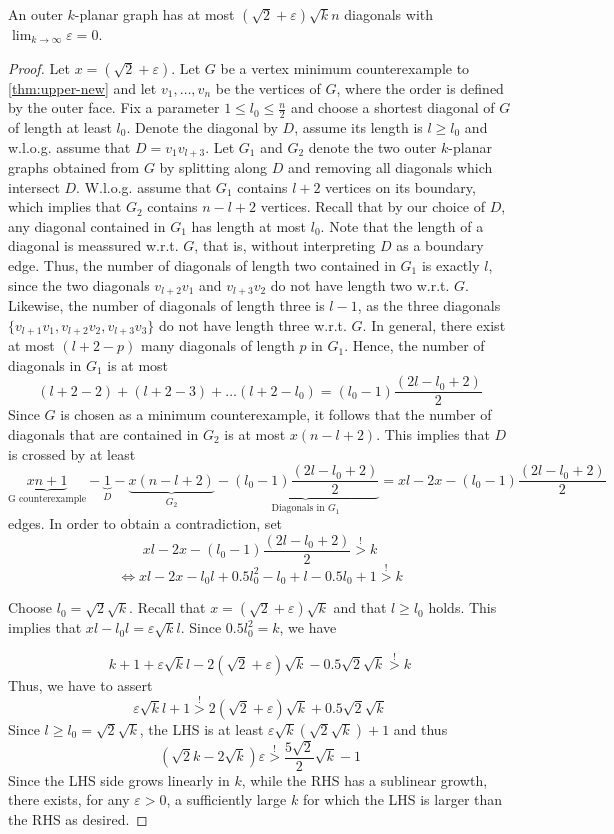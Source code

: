 \documentclass[10pt,a4paper]{amsart}
\begin{document}
\begin{theorem} \label{thm:upper-new}
An outer $k$-planar graph has at most $(\sqrt{2}+\varepsilon)\sqrt{k}n$ diagonals with 
$\lim_{k\to \infty} \varepsilon= 0$.
\end{theorem}

\begin{proof}
Let $x = (\sqrt{2}+\varepsilon)$.
Let $G$ be a vertex minimum counterexample to \cref{thm:upper-new} and let $v_1,\dots,v_n$ be the vertices of $G$, where the order is defined by the outer face. Fix a parameter $1 \leq l_0 \leq \frac{n}{2}$ and choose a shortest diagonal of $G$ of length at least $l_0$. Denote the diagonal by $D$, assume its length is $l \geq l_0$ and w.l.o.g. assume that $D = v_1v_{l+3}$. Let $G_1$ and $G_2$ denote the two outer $k$-planar graphs obtained from $G$ by splitting along $D$ and removing all diagonals which intersect $D$. W.l.o.g. assume that $G_1$ contains $l+2$ vertices on its boundary, which implies that $G_2$ contains $n-l+2$ vertices.
Recall that by our choice of $D$, any diagonal contained in $G_1$ has length at most $l_0$.
Note that the length of a diagonal is meassured w.r.t. $G$, that is, without interpreting $D$ as a boundary edge. Thus, the number of diagonals of length two contained in $G_1$ is exactly $l$, since the two diagonals $v_{l+2}v_1$ and $v_{l+3}v_2$ do not have length two w.r.t. $G$. 
Likewise, the number of diagonals of length three is $l-1$, as the three diagonals $\{v_{l+1}v_1,v_{l+2}v_2,v_{l+3}v_3\}$ do not have length three w.r.t. $G$. In general, there exist at most $(l+2-p)$ many diagonals of length $p$ in $G_1$.
Hence, the number of diagonals in $G_1$ is at most
\[(l+2-2)+(l+2-3)+\dots(l+2-l_0) = (l_0-1)\frac{(2l-l_0+2)}{2}\]
Since $G$ is chosen as a minimum counterexample, it follows that the number of diagonals that are contained in $G_2$ is at most $x(n-l+2)$.
This implies that $D$ is crossed by at least
\[\underbrace{xn+1}_{\text{G counterexample}} -\underbrace{1}_D - \underbrace{x(n-l+2)}_{G_2} - \underbrace{(l_0-1)\frac{(2l-l_0+2)}{2}}_{\text{Diagonals in }G_1} = xl-2x - (l_0-1)\frac{(2l-l_0+2)}{2} \] edges.
In order to obtain a contradiction, set
\[xl-2x - (l_0-1)\frac{(2l-l_0+2)}{2} \stackrel{!}{>} k\]
\[\Leftrightarrow xl-2x-l_0l+0.5l_0^2-l_0+l-0.5l_0+1 \stackrel{!}{>}k\]

Choose $l_0 = \sqrt{2}\sqrt{k}$. Recall that $x = (\sqrt{2}+\varepsilon)\sqrt{k}$ and that $l \geq l_0$ holds. 
This implies that $xl-l_0l = \varepsilon\sqrt{k}l$. Since $0.5l_0^2 = k$, we have

\[k + 1 + \varepsilon\sqrt{k}l -2(\sqrt{2}+\varepsilon)\sqrt{k} -0.5\sqrt{2}\sqrt{k} \stackrel{!}{>}k \]
Thus, we have to assert
\[\varepsilon\sqrt{k}l + 1 \stackrel{!}{>} 2(\sqrt{2}+\varepsilon)\sqrt{k} +0.5\sqrt{2}\sqrt{k}\]
Since $l \geq l_0 = \sqrt{2}\sqrt{k}$, the LHS is at least $\varepsilon\sqrt{k}(\sqrt{2}\sqrt{k})+1$ and thus
\[(\sqrt{2}k-2\sqrt{k})\varepsilon \stackrel{!}{>}\frac{5\sqrt{2}}{2}\sqrt{k}-1 \]
Since the LHS side grows linearly in $k$, while the RHS has a sublinear growth, there exists, for any $\varepsilon > 0$, a sufficiently large $k$ for which the LHS is larger than the RHS as desired.
\end{proof}
\end{document}

